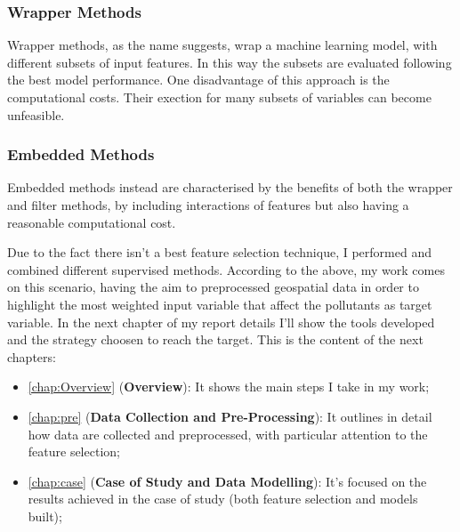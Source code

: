 \subsubsection{Wrapper Methods}
Wrapper methods, as the name suggests, wrap a machine learning model, with different subsets of input features. In this way the subsets are evaluated following the best model performance.
One disadvantage of this approach is the computational costs.
Their exection for many subsets of variables can become unfeasible. 
\subsubsection{Embedded Methods}
Embedded methods instead are characterised by the benefits of both the wrapper and filter methods, by including interactions of features but also having a reasonable computational cost.\par
\bigskip
Due to the fact there isn’t a best feature selection technique, I performed and combined different supervised methods. 
According to the above, my work comes on this scenario, having the aim to preprocessed geospatial data in order to highlight the most weighted input variable that affect the pollutants as target variable.
In the next chapter of my report details I'll show the tools developed and the strategy choosen to reach the target. 
This is the content of the next chapters:

\begin{itemize}
  \item \autoref{chap:Overview} (\textbf{Overview}): It shows the main steps I take in my work;
  \item \autoref{chap:pre} (\textbf{Data Collection and Pre-Processing}): It outlines in detail how data are collected and preprocessed, with particular attention to the feature selection;
  \item \autoref{chap:case} (\textbf{Case of Study and Data Modelling}): It's focused on the results achieved in the case of study (both feature selection and models built);
\end{itemize}
\begin{comment}
Indeed, in recent years ensemble feature selection are being implemented by researchers  
approaches are being developed by researchers. They follow a similar recipe with the well-established ensemble on classification algorithms, which provides better results and robustness than employing single algorithms
\end{comment}



